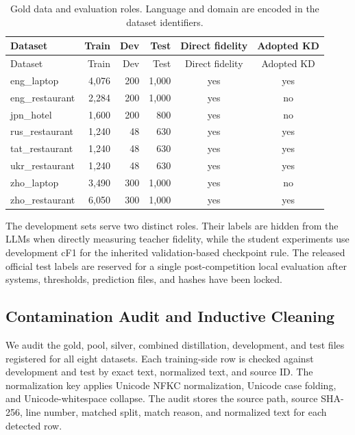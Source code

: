 {\small
\begin{longtable}{@{\extracolsep{\fill}}lrrrcc@{}}
\caption{Gold data and evaluation roles. Language and domain are encoded in
the dataset identifiers.}
\label{tab:data-roles}\\
\toprule
Dataset & Train & Dev & Test & Direct fidelity & Adopted KD \\
\midrule
\endfirsthead
\toprule
Dataset & Train & Dev & Test & Direct fidelity & Adopted KD \\
\midrule
\endhead
\bottomrule
\endlastfoot
eng\_laptop     & 4,076 & 200 & 1,000 & yes & yes \\
eng\_restaurant & 2,284 & 200 & 1,000 & yes & no  \\
jpn\_hotel       & 1,600 & 200 &   800 & yes & no  \\
rus\_restaurant & 1,240 &  48 &   630 & yes & yes \\
tat\_restaurant & 1,240 &  48 &   630 & yes & yes \\
ukr\_restaurant & 1,240 &  48 &   630 & yes & yes \\
zho\_laptop      & 3,490 & 300 & 1,000 & yes & no  \\
zho\_restaurant & 6,050 & 300 & 1,000 & yes & yes \\
\end{longtable}}

The development sets serve two distinct roles. Their labels are hidden
from the LLMs when directly measuring teacher fidelity, while the
student experiments use development cF1 for the inherited
validation-based checkpoint rule. The released official test labels are
reserved for a single post-competition local evaluation after systems,
thresholds, prediction files, and hashes have been locked.

\subsection{Contamination Audit and Inductive
Cleaning}\label{contamination-audit-and-inductive-cleaning}

We audit the gold, pool, silver, combined distillation, development, and
test files registered for all eight datasets. Each training-side row is
checked against development and test by exact text, normalized text, and
source ID. The normalization key applies Unicode NFKC normalization,
Unicode case folding, and Unicode-whitespace collapse. The audit stores
the source path, source SHA-256, line number, matched split, match
reason, and normalized text for each detected row.

